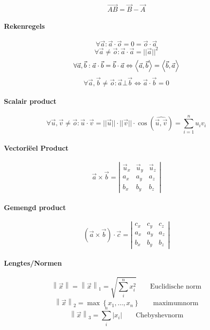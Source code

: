 \[
  \overrightarrow{AB} = \vec{B} - \vec{A}
\]

\paragraph{Rekenregels}
\label{sec:RekenregelsVectoren}
     \[
       \forall \vec a:
          \vec a \cdot \vec o = 0 = \vec o \cdot \vec a
     \]
   \[
       \forall \vec a \neq \vec o:
          \vec a \cdot \vec a = ||\vec a||^2
     \]
     \[
       \forall \vec a, \vec b :
          \vec a \cdot \vec b = \vec b \cdot \vec a
           \Leftrightarrow \left\langle \vec{a},\vec{b} \right\rangle = \left\langle \vec{b},\vec{a} \right\rangle
     \]
     \[
       \forall \vec a, \vec b \neq \vec o:
          \vec a \bot \vec b \Leftrightarrow \vec a \cdot \vec b = 0
     \]

\paragraph{Scalair product}
\label{sec:scalairProduct}
     \[
       \forall \vec u, \vec v \neq \vec o :
          \vec u \cdot \vec v = ||\vec u|| \cdot ||\vec v|| \cdot \cos\left(\widehat{\vec u, \vec v}\right)
                              = \sum_{i=1}^n u_iv_i
     \]
\paragraph{Vectoriëel Product}
\label{sec:VectorieelProduct}
  \[
    \vec a \times \vec b =
    \left|
     \begin{array}{ccc}
       \vec u_x  &  \vec u_y  &  \vec u_z \\
      a_x & a_y & a_z\\
      b_x & b_y & b_z
     \end{array}
   \right|
  \]
\paragraph{Gemengd product}
\label{sec:GemengdProduct}
  \[
    \left(\vec a \times \vec b \right) \cdot \vec c=
    \left|
     \begin{array}{ccc}
      c_x & c_y & c_z \\
      a_x & a_y & a_z\\
      b_x & b_y & b_z
     \end{array}
   \right|
  \]

\paragraph{Lengtes/Normen}
\label{sec:Lengtes}
\[
  \left\| \vec{x} \right\| =
  \left\| \vec{x} \right\|_1 =
  \sqrt{\sum_i^n x_i^2}
  \qquad
  \mbox{Euclidische norm}
\]
\[
  \left\| \vec{x} \right\|_2 =
  \max \left\{ x_1,  \ldots, x_n \right\}
  \qquad
  \mbox{maximumnorm}
\]
\[
  \left\| \vec{x} \right\|_3 =
  \sum_i^n \left| x_i \right|
  \qquad
  \mbox{Chebyshevnorm}
\]

